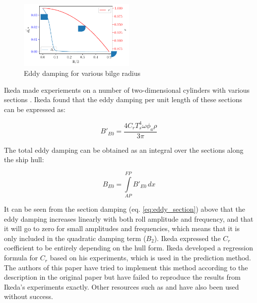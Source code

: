     \begin{figure}[H]
        \begin{center}\includegraphics[width = 0.5\textwidth]{figures/eddy_sigma.pdf}\end{center}
        \vspace{-1cm}
        \caption{Eddy damping for various bilge radius}
        \label{fig:eddy_sigma}
    \end{figure}
    
    Ikeda made experiements on a number of two-dimensional cylinders with
various sections \citep{7505983/4AFVVGNT}. Ikeda found that the eddy
damping per unit length of these sections can be expressed as: 
 
            
    
    \begin{equation}
B'_{E0} = \frac{4 C_{r} T_{s}^{4} \omega \phi_{a} \rho}{3 \pi}
\label{eq:eddy_section}
\end{equation}

    

    The total eddy damping can be obtained as an integral over the sections
along the ship hull:
 
            
    
    \begin{equation}
B_{E0} = \int\limits_{AP}^{FP} B'_{E0}\, dx
\label{eq:equation}
\end{equation}

    

    It can be seen from the section damping (eq.
\ref{eq:eddy_section}) above that the eddy damping increases
linearly with both roll amplitude and frequency, and that it will go to
zero for small amplitudes and frequencies, which means that it is only
included in the quadratic damping term ($B_2$). Ikeda expressed the
$C_r$ coefficient to be entirely depending on the hull form. Ikeda
developed a regression formula for $C_r$ based on his experiments,
which is used in the prediction method. The authors of this paper have
tried to implement this method according to the description in the
original paper \citep{7505983/4AFVVGNT} but have failed to reproduce the
results from Ikeda's experiments exactly. Other resources such as
\citep{7505983/FB64RGPF} and \citep{7505983/KAKIM2E2} have also been used
without success.

